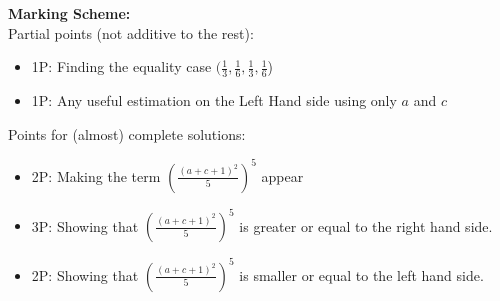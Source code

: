 \textbf{Marking Scheme:} \\
Partial points (not additive to the rest):
\begin{itemize}
    \item 1P: Finding the equality case $(\frac{1}{3}, \frac{1}{6}, \frac{1}{3}, \frac{1}{6}$)
    \item 1P: Any useful estimation on the Left Hand side using only $a$ and $c$
\end{itemize} 
Points for (almost) complete solutions:
\begin{itemize}
    \item 2P: Making the term $\left( \frac{(a+c+1)^2}{5} \right)^5$ appear
    \item 3P: Showing that $\left( \frac{(a+c+1)^2}{5} \right)^5$ is greater or equal to the right hand side.
    \item 2P: Showing that $\left( \frac{(a+c+1)^2}{5} \right)^5$ is smaller or equal to the left hand side.
\end{itemize}